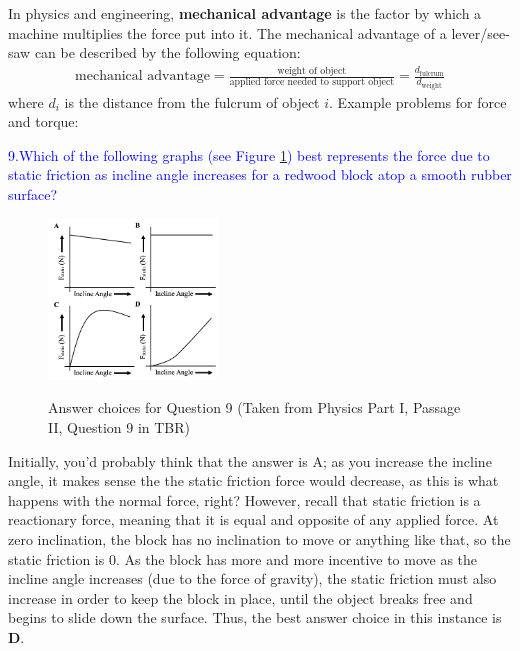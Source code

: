\documentclass{article}
\theoremstyle{plain}%
\theoremstyle{definition}
\theoremstyle{remark}
\begin{document}
\indent In physics and engineering, \textbf{mechanical advantage} is the factor by which a machine multiplies the force put into it. The mechanical advantage of a lever/see-saw can be described by the following equation:
\begin{equation}
\begin{split}
\text{mechanical advantage}=\frac{\text{weight of object}}{\text{applied force needed to support object}}=\frac{d_{\text{fulcrum}}}{d_{\text{weight}}}
\end{split}
\end{equation}
\noindent where $d_i$ is the distance from the fulcrum of object $i$. Example problems for force and torque:
\begin{center}
\begin{minipage}{30em}
\textcolor{blue}{9.\quad Which of the following graphs (see Figure \ref{Physics_1_2_9}) best represents the force due to static friction as incline angle increases for a redwood block atop a smooth rubber surface?}
\end{minipage}
\end{center}
\begin{figure}[h!]
\centering
\includegraphics[width=0.4\textwidth]{Physics_1_2_9.png} \label{Physics_1_2_9}
\caption{Answer choices for Question 9 (Taken from Physics Part I, Passage II, Question 9 in TBR)}
\end{figure}
\indent Initially, you'd probably think that the answer is A; as you increase the incline angle, it makes sense the the static friction force would decrease, as this is what happens with the normal force, right? However, recall that static friction is a reactionary force, meaning that it is equal and opposite of any applied force. At zero inclination, the block has no inclination to move or anything like that, so the static friction is 0. As the block has more and more incentive to move as the incline angle increases (due to the force of gravity), the static friction must also increase in order to keep the block in place, until the object breaks free and begins to slide down the surface. Thus, the best answer choice in this instance is \textbf{D}. \\
\end{document}
